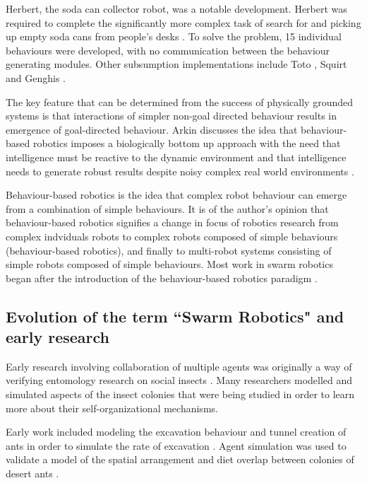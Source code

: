Herbert, the soda can collector robot, was a notable development. Herbert was required to complete the significantly more complex task of search for and picking up empty soda cans from people's desks \cite{connell1989colony}. To solve the problem, 15 individual behaviours were developed, with no communication between the behaviour generating modules. Other subsumption implementations include Toto \cite{mataric1990distributed}, Squirt \cite{flynn1989world} and Genghis \cite{brooks1989robot}.

The key feature that can be determined from the success of physically grounded systems is that interactions of simpler non-goal directed behaviour results in emergence of goal-directed behaviour. Arkin discusses the idea that behaviour-based robotics imposes a biologically bottom up approach with the need that intelligence must be reactive to the dynamic environment and that intelligence needs to generate robust results despite noisy complex real world environments \cite{arkin1990integrating}.

Behaviour-based robotics is the idea that complex robot behaviour can emerge from a combination of simple behaviours. It is of the author's opinion that behaviour-based robotics signifies a change in focus of robotics research from complex indviduals robots to complex robots composed of simple behaviours (behaviour-based robotics), and finally to multi-robot systems consisting of simple robots composed of simple behaviours. Most work in swarm robotics began after the introduction of the behaviour-based robotics paradigm \cite{arai2002editorial}.

\subsection{Evolution of the term ``Swarm Robotics" and early research}
\label{early-research}

Early research involving collaboration of multiple agents was originally a way of verifying entomology research on social insects \cite{dorigo2014swarm, beni1993swarm, seeley2009wisdom}. Many researchers modelled and simulated aspects of the insect colonies that were being studied in order to learn more about their self-organizational mechanisms. 

Early work included modeling the excavation behaviour and tunnel creation of ants in order to simulate the rate of excavation \cite{sudd1975model}. Agent simulation was used to validate a model of the spatial arrangement and diet overlap between colonies of desert ants \cite{ryti1984spatial}.

